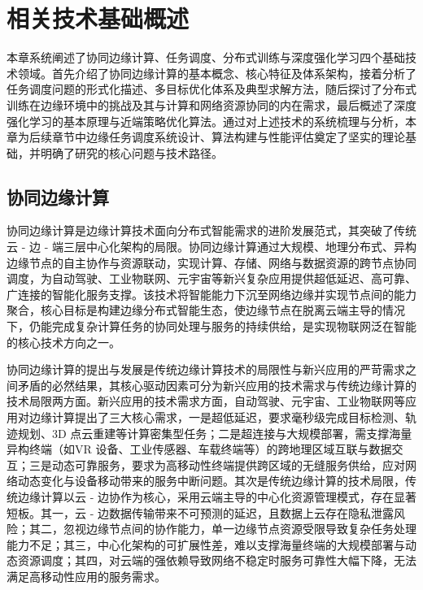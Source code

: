 \chapter{相关技术基础概述}
本章系统阐述了协同边缘计算、任务调度、分布式训练与深度强化学习四个基础技术领域。首先介绍了协同边缘计算的基本概念、核心特征及体系架构，接着分析了任务调度问题的形式化描述、多目标优化体系及典型求解方法，随后探讨了分布式训练在边缘环境中的挑战及其与计算和网络资源协同的内在需求，最后概述了深度强化学习的基本原理与近端策略优化算法。通过对上述技术的系统梳理与分析，本章为后续章节中边缘任务调度系统设计、算法构建与性能评估奠定了坚实的理论基础，并明确了研究的核心问题与技术路径。
\section{协同边缘计算}
协同边缘计算是边缘计算技术面向分布式智能需求的进阶发展范式，其突破了传统云 - 边 - 端三层中心化架构的局限\cite{EaaS}。协同边缘计算通过大规模、地理分布式、异构边缘节点的自主协作与资源联动，实现计算、存储、网络与数据资源的跨节点协同调度，为自动驾驶、工业物联网、元宇宙等新兴复杂应用提供超低延迟、高可靠、广连接的智能化服务支撑\cite{8758310}。该技术将智能能力下沉至网络边缘并实现节点间的能力聚合，核心目标是构建边缘分布式智能生态，使边缘节点在脱离云端主导的情况下，仍能完成复杂计算任务的协同处理与服务的持续供给，是实现物联网泛在智能的核心技术方向之一。

协同边缘计算的提出与发展是传统边缘计算技术的局限性与新兴应用的严苛需求之间矛盾的必然结果，其核心驱动因素可分为新兴应用的技术需求与传统边缘计算的技术局限两方面\cite{10818760}。新兴应用的技术需求方面，自动驾驶、元宇宙、工业物联网等应用对边缘计算提出了三大核心需求，一是超低延迟，要求毫秒级完成目标检测、轨迹规划、3D 点云重建等计算密集型任务；二是超连接与大规模部署，需支撑海量异构终端（如VR 设备、工业传感器、车载终端等）的跨地理区域互联与数据交互；三是动态可靠服务，要求为高移动性终端提供跨区域的无缝服务供给，应对网络动态变化与设备移动带来的服务中断问题。其次是传统边缘计算的技术局限，传统边缘计算以云 - 边协作为核心，采用云端主导的中心化资源管理模式，存在显著短板。其一，云 - 边数据传输带来不可预测的延迟，且数据上云存在隐私泄露风险；其二，忽视边缘节点间的协作能力，单一边缘节点资源受限导致复杂任务处理能力不足；其三，中心化架构的可扩展性差，难以支撑海量终端的大规模部署与动态资源调度；其四，对云端的强依赖导致网络不稳定时服务可靠性大幅下降，无法满足高移动性应用的服务需求\cite{9411933}。

